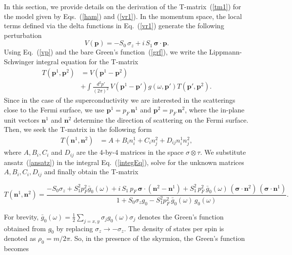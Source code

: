 \documentclass[twocolumn,showpacs,floatfix,longbibliography]{revtex4-1}
\begin{document}
In this section, we provide details on the derivation of the T-matrix~(\ref{tm1}) for the model given by Eqs.~(\ref{ham}) and (\ref{vr1}). In the momentum space, the local terms defined via the delta functions in Eq.~(\ref{vr1}) generate the following perturbation
\begin{equation}
	V(\bm p) = -S_0\,\sigma_z +  i \,S_1 \, \bm \sigma\cdot \bm  p.
	\label{vp}
\end{equation}
Using Eq.~(\ref{vp}) and the bare Green's function~(\ref{grf}), we write the Lippmann-Schwinger integral equation for the T-matrix
\begin{align}
	T\left(\bm p^{1},\bm p^{2}\right) &= V \left(\bm p^{1}-\bm p^{2}\right) \nonumber \\
	& +\int \frac{d^2 p'}{\left( 2\pi \right)^2}\, V\left(\bm p^{1}-\bm p'\right) g(\omega,\bm p')  T\left(\bm p',\bm p^{2}\right).
	\label{integEq}
\end{align}
Since in the case of the superconductivity we are interested in the scatterings close to the Fermi surface, we use $\bm p^{1} = p_F\, \bm n^{1}$ and $\bm p^{2} = p_F \,\bm n^{2}$, where the in-plane unit vectors $\bm n^{1}$ and $\bm n^{2}$ determine the direction of scattering on the Fermi surface.  Then, we seek the T-matrix in the following form
\begin{align}
	T\left(\bm n^{1},\bm n^{2}\right) &= A + B_i n^{1}_i + C_i n^{2}_j + D_{ij} n^{1}_i n^{2}_j, \label{ansatz}
\end{align}
where  $A,B_i,C_i$ and $D_{ij}$ are the 4-by-4 matrices in the space $\sigma\otimes\tau$. We substitute ansatz~(\ref{ansatz}) in the integral Eq.~(\ref{integEq}), solve for the unknown matrices $A,B_i,C_i,D_{ij}$ and finally obtain the T-matrix
\begin{widetext}
\begin{equation}
	T\left(\bm n^{1},\bm n^{2}\right) = \frac{-S_0\sigma_z+S^2_1p_F^2\bar g_{0}(\omega)+i\,S_1\,p_F \,  \bm \sigma\cdot(\bm n^{2}- \bm n^{1}) +S^2_1\, p^2_F \, \bar g_{0}(\omega)\,\left(\bm \sigma\cdot\bm n^{2}\right)\,\left(\bm \sigma\cdot \bm n^{1}\right)}{1+S_0\sigma_zg_{0}-S^2_1p_F^2\,\bar g_{0}(\omega)\, g_{0}(\omega)}. \label{TM}
\end{equation}
\end{widetext}
For brevity, $\bar g_0(\omega) = \frac{1}{2}\sum_{j=x,y} \sigma_j g_0(\omega) \sigma_j $ denotes the Green's function obtained from $g_{0}$ by replacing $\sigma_z \rightarrow - \sigma_z$. The density of states per spin is denoted as $\rho_0 = m/2\pi$. So, in the presence of the skyrmion, the Green's function becomes
\end{document}
